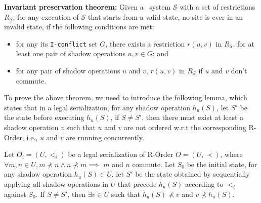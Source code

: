 \begin{theorem}
{\bf Invariant preservation theorem:} Given a \PRCAJ\ system $\mathscr{S}$
with a set of restrictions
$R_{\mathscr{S}}$, for any execution of $\mathscr{S}$ that starts from a valid state, no site
is ever in an invalid state, if the following conditions are met:
\begin{itemize}
 \item for any its {\tt I-conflict} set $G$, there exists
a restriction $r(u, v)$ in $R_{\mathscr{S}}$, for at least one pair of shadow operations $u, v \in G$; and
 \item for any pair of shadow operations $u$ and $v$, $r(u, v)$ in  $R_{\mathscr{S}}$ if $u$ and $v$ don't commute.
\end{itemize}

\label{theorem:invpreserve}
\end{theorem}
To prove the above theorem, we need to introduce the following lemma, which states that
in a legal serialization, for any shadow operation $h_u(S)$, let $S'$ be the state before
executing $h_u(S)$, if $S \neq S'$, then there must exist at least a shadow operation $v$ such that
$u$ and $v$ are not ordered w.r.t the corresponding R-Order, i.e., $u$ and $v$ are running concurrently.

\begin{lemma}\label{lem:concurrentexists}
Let $O_i=(U,<_i)$ be  a legal serialization of R-Order $O=(U,\prec)$, 
where $\forall m, n\in U, m\not\prec n \wedge n\not\prec m \implies $ $m$ and $n$
commute. Let $S_0$ be the initial state, for any
shadow operation $h_u(S) \in U$, let $S'$ be the state obtained by sequentially applying all shadow
operations in $U$ that precede $h_u(S)$ according to $<_i$ against $S_0$.
If $S \neq S'$, then $\exists v\in U$ such that $h_u(S)\not\prec v$ and $v\not\prec h_u(S)$.
\end{lemma}

